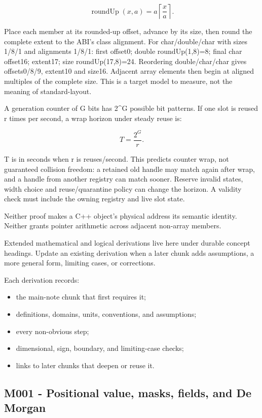 \[
\operatorname{roundUp}(x,a)=a\left\lceil\frac{x}{a}\right\rceil.
\]

Place each member at its rounded-up offset, advance by its size, then round the complete extent to the ABI's class alignment. For char/double/char with sizes 1/8/1 and alignments 1/8/1: first offset0; double roundUp(1,8)=8; final char offset16; extent17; size roundUp(17,8)=24. Reordering double/char/char gives offsets0/8/9, extent10 and size16. Adjacent array elements then begin at aligned multiples of the complete size. This is a target model to measure, not the meaning of standard-layout.

A generation counter of G bits has 2\^{}G possible bit patterns. If one slot is reused r times per second, a wrap horizon under steady reuse is:

\[
T=\frac{2^G}{r}.
\]

T is in seconds when r is reuses/second. This predicts counter wrap, not guaranteed collision freedom: a retained old handle may match again after wrap, and a handle from another registry can match sooner. Reserve invalid states, width choice and reuse/quarantine policy can change the horizon. A validity check must include the owning registry and live slot state.

Neither proof makes a C++ object's physical address its semantic identity. Neither grants pointer arithmetic across adjacent non-array members.

Extended mathematical and logical derivations live here under durable concept headings. Update an existing derivation when a later chunk adds assumptions, a more general form, limiting cases, or corrections.

Each derivation records:

\begin{itemize}
\tightlist
\item
  the main-note chunk that first requires it;
\item
  definitions, domains, units, conventions, and assumptions;
\item
  every non-obvious step;
\item
  dimensional, sign, boundary, and limiting-case checks;
\item
  links to later chunks that deepen or reuse it.
\end{itemize}

\subsection{M001 - Positional value, masks, fields, and De Morgan}\label{m001---positional-value-masks-fields-and-de-morgan}

